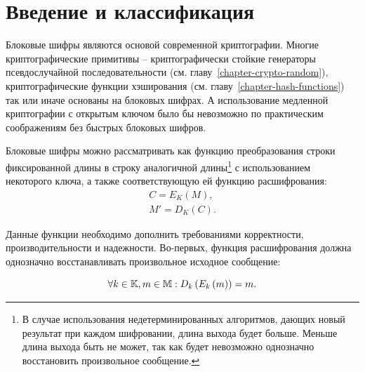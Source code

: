 \section{Введение и классификация}

Блоковые шифры являются основой современной криптографии. Многие криптографические примитивы -- криптографически стойкие генераторы псевдослучайной последовательности (см. главу~\ref{chapter-crypto-random}), криптографические функции хэширования (см. главу~\ref{chapter-hash-functions}) так или иначе основаны на блоковых шифрах. А использование медленной криптографии с открытым ключом было бы невозможно по практическим соображениям без быстрых блоковых шифров.

Блоковые шифры можно рассматривать как функцию преобразования строки фиксированной длины в строку аналогичной длины\footnote{В случае использования недетерминированных алгоритмов, дающих новый результат при каждом шифровании, длина выхода будет больше. Меньше длина выхода быть не может, так как будет невозможно однозначно восстановить произвольное сообщение.} с использованием некоторого ключа, а также соответствующую ей функцию расшифрования:
\[\begin{array}{l}
	C = E_K\left( M \right), \\
	M'= D_K\left( C \right).
\end{array}\]

Данные функции необходимо дополнить требованиями корректности, производительности и надежности. Во-первых, функция расшифрования должна однозначно восстанавливать произвольное исходное сообщение:

\[ \forall k \in \mathbb{K}, m \in \mathbb{M}: D_k \left( E_k\left( m \right) \right) = m. \]

